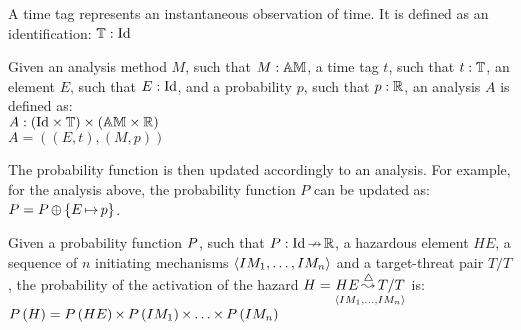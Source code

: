 \begin{definition}
A time tag represents an instantaneous observation of time.
%
It is defined as an identification: $\hmdatatypetimetag: \hmdatatypeId$
\end{definition}

\begin{definition}[Analysis]
Given an analysis method $M$, such that $M: \hmdatatypeAM$, a time tag $t$, such that $t:\hmdatatypetimetag$, an element $E$, such that $E:\hmdatatypeId$, and a probability $p$, such that $p:\hmdatatypeR$, an analysis $A$ is defined as:
%
\\$A: \hmcartesian{\left(\hmcartesian{\hmdatatypeId}{\hmdatatypetimetag}\right)}{\left(\hmcartesian{\hmdatatypeAM}{\hmdatatypeR}\right)}$
%
\\$A = \left(\left(E, t\right), \left(M, p\right) \right)$

\end{definition}
The probability function is then updated accordingly to an analysis. For example, for the analysis above, the probability function $P$ can be updated as:
$\hmprobabilitysymbol = \hmoverride{\hmprobabilitysymbol}{\left\{\hmmapsto{E}{p}\right\}}$.

\begin{definition}
Given a probability function $\hmprobabilitysymbol$, such that $P: \hmpartialfunction {\hmdatatypeId}{\hmdatatypeR}$, a hazardous element $HE$, a sequence of $n$ initiating mechanisms $\hmseqenum{IM_1,\ldots,IM_n}$ and a target-threat pair $T/T$, the probability of the activation of the hazard $H = \hmhazard{HE}{\hmseqenum{IM_1,\ldots,IM_n}}{T/T}$ is:
%
\\$\hmprobability{H} = \hmtimes{\hmprobability{HE}}{\hmtimes{\hmtimes{\hmprobability{IM_1}}{\ldots}}{\hmprobability{IM_n}}}$
\end{definition}

